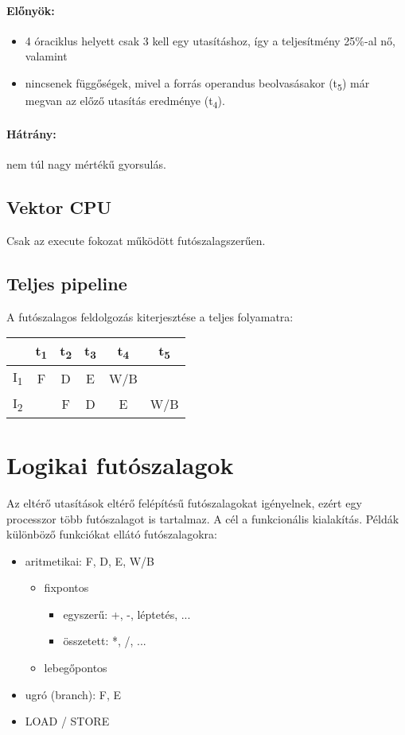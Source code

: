 \paragraph{Előnyök:}
\begin{itemize}
    \item 4 óraciklus helyett csak 3 kell egy utasításhoz, így a teljesítmény 25\%-al nő, valamint
    \item nincsenek függőségek, mivel a forrás operandus beolvasásakor (t\textsubscript{5}) már megvan az előző utasítás eredménye (t\textsubscript{4}).
\end{itemize}
\paragraph{Hátrány:} nem túl nagy mértékű gyorsulás.

\subsection{Vektor CPU}
Csak az execute fokozat működött futószalagszerűen.

\subsection{Teljes pipeline}
A futószalagos feldolgozás kiterjesztése a teljes folyamatra:
\begin{center}
    \begin{tabular}{ c | c | c | c | c | c  }
        & t\textsubscript{1} & t\textsubscript{2} & t\textsubscript{3} &t\textsubscript{4} & t\textsubscript{5} \\
        \hline
        I\textsubscript{1} & F & D & E & W/B \\
        \hline
        I\textsubscript{2} &   &  F & D & E & W/B
    \end{tabular}
\end{center}

\section{Logikai futószalagok} \label{logikai_futoszalag}
Az eltérő utasítások eltérő felépítésű futószalagokat igényelnek, ezért egy processzor több futószalagot is tartalmaz.
A cél a funkcionális kialakítás. Példák különböző funkciókat ellátó futószalagokra:
\begin{itemize}
    \item aritmetikai: F, D, E, W/B
    \begin{itemize}
        \item fixpontos
        \begin{itemize}
            \item egyszerű: +, -, léptetés, ...
            \item összetett: *, /, ...
        \end{itemize}
        \item lebegőpontos
    \end{itemize}
    \item ugró (branch): F, E
    \item LOAD / STORE
\end{itemize}
